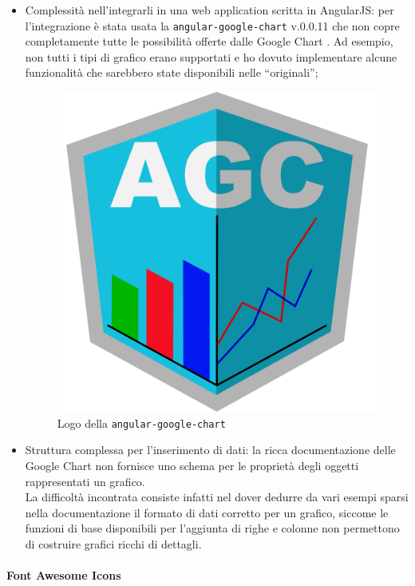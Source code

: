 \begin{itemize}
\item Complessità nell'integrarli in una web application scritta in AngularJS:
  per l'integrazione è stata usata la 
  \texttt{angular-google-chart} v.0.0.11 che non copre completamente tutte le
  possibilità offerte dalle Google Chart . Ad esempio, non tutti i
  tipi di grafico erano supportati e ho dovuto implementare alcune
  funzionalità che sarebbero state disponibili nelle  ``originali'';

\begin{figure}[H]%
\centering
\includegraphics[width=.5\columnwidth]{immagini/ang-goog-chart-logo}
\caption{Logo della  \texttt{angular-google-chart}}
\label{fig:logo-agc}%
\end{figure}

\item Struttura complessa per l'inserimento di dati: la ricca documentazione
  delle Google Chart  non fornisce uno schema per le proprietà
  degli oggetti rappresentati un grafico. \\
  La difficoltà incontrata consiste infatti nel dover dedurre da vari esempi
  sparsi nella documentazione il formato di dati corretto per un grafico,
  siccome le funzioni di base disponibili per l'aggiunta di righe e colonne
  non permettono di costruire grafici ricchi di dettagli.
\end{itemize}

\paragraph{Font Awesome Icons} \mbox{} \\

